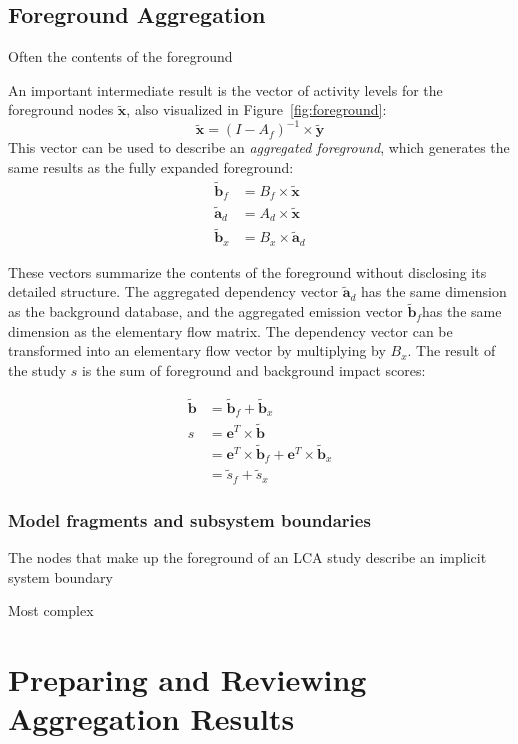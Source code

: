 \subsection{Foreground Aggregation}

Often the contents of the foreground

An important intermediate result is the vector of activity levels for the foreground nodes $\tilde{\mathbf{x}}$, also visualized in Figure~\ref{fig:foreground}:
\begin{equation}
\tilde{\mathbf{x}} = (I - A_f)^{-1} \times \tilde{\mathbf{y}}
\label{eqn:inv}
\end{equation}
This vector can be used to describe an \emph{aggregated foreground}, which generates the same results as the fully expanded foreground:
\begin{equation}
\begin{array}{rl}
    \tilde{\mathbf{b}}_f & = B_f \times \tilde{\mathbf{x}} \\
    \tilde{\mathbf{a}}_d & = A_d \times \tilde{\mathbf{x}} \\
    \tilde{\mathbf{b}}_x & = B_x \times \tilde{\mathbf{a}}_d
\end{array}
\label{eqn:agg}
\end{equation}

These vectors summarize the contents of the foreground without disclosing its detailed structure.  The aggregated dependency vector $\tilde{\mathbf{a}}_d$ has the same dimension as the background database, and the aggregated emission vector $\tilde{\mathbf{b}}_f $has the same dimension as the elementary flow matrix.  The dependency vector can be transformed into an elementary flow vector by multiplying by $B_x$.  The result of the study $s$ is the sum of foreground and background impact scores:

\begin{equation}
\begin{array}{rl}
   \tilde{\mathbf{b}} & = \tilde{\mathbf{b}}_f + \tilde{\mathbf{b}}_x \\
   s &= \mathbf{e}^T \times \tilde{\mathbf{b}} \\
   & = \mathbf{e}^T \times \tilde{\mathbf{b}}_f + \mathbf{e}^T \times \tilde{\mathbf{b}}_x \\
   &= \tilde{s}_f + \tilde{s}_x
\end{array}
\label{eqn:lci}
\end{equation}



\subsubsection{Model fragments and subsystem boundaries}


The nodes that make up the foreground of an LCA study describe an implicit system boundary

Most complex


\section{Preparing and Reviewing Aggregation Results}



